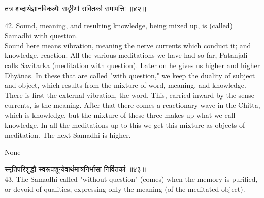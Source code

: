 \begin{center}
\begin{sanskrit}
तत्र शब्दार्थज्ञानविकल्पैः सङ्कीर्णा
सवितर्का समापत्तिः ॥४२॥
\end{sanskrit}
\end{center}
42. Sound, meaning, and resulting knowledge, being mixed up,
is (called) Samadhi with question. \\

Sound here means vibration, meaning the nerve currents which
conduct it; and knowledge, reaction. All the various meditations we
have had so far, Patanjali calls Savitarka (meditation with question).
Later on he gives us higher and higher Dhyânas. In these that are
called "with question," we keep the duality of subject and object,
which results from the mixture of word, meaning, and knowledge. There
is first the external vibration, the word. This, carried inward by the
sense currents, is the meaning. After that there comes a reactionary
wave in the Chitta, which is knowledge, but the mixture of these three
makes up what we call knowledge. In all the meditations up to this we
get this mixture as objects of meditation. The next Samadhi is higher. \\

\begin{center}
\begin{sanskrit}
None
\end{sanskrit}
\end{center}
स्मृतिपरिशुद्धौ स्वरूपशून्येवार्थमात्रनिर्भासा निर्वितर्का ॥४३॥\\

43. The Samadhi called "without question" (comes) when the
memory is purified, or devoid of qualities, expressing only the meaning
(of the meditated object). \\

